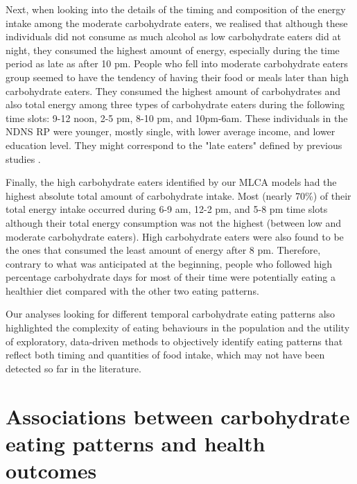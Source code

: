 Next, when looking into the details of the timing and composition of the energy intake among the moderate carbohydrate eaters, we realised that although these individuals did not consume as much alcohol as low carbohydrate eaters did at night, they consumed the highest amount of energy, especially during the time period as late as after 10 pm. People who fell into moderate carbohydrate eaters group seemed to have the tendency of having their food or meals later than high carbohydrate eaters. They consumed the highest amount of carbohydrates and also total energy among three types of carbohydrate eaters during the following time slots: 9-12 noon, 2-5 pm, 8-10 pm, and 10pm-6am. These individuals in the NDNS RP were younger, mostly single, with lower average income, and lower education level. They might correspond to the "late eaters" defined by previous studies \parencite{leech2017temporal, mansukhani2018investigating}. 

Finally, the high carbohydrate eaters identified by our MLCA models had the highest absolute total amount of carbohydrate intake. Most (nearly 70\%) of their total energy intake occurred during 6-9 am, 12-2 pm, and 5-8 pm time slots although their total energy consumption was not the highest (between low and moderate carbohydrate eaters). High carbohydrate eaters were also found to be the ones that consumed the least amount of energy after 8 pm. Therefore, contrary to what was anticipated at the beginning, people who followed high percentage carbohydrate days for most of their time were potentially eating a healthier diet compared with the other two eating patterns. 

Our analyses looking for different temporal carbohydrate eating patterns also highlighted the complexity of eating behaviours in the population and the utility of exploratory, data-driven methods to objectively identify eating patterns that reflect both timing and quantities of food intake, which may not have been detected so far in the literature.


\section{Associations between carbohydrate eating patterns and health outcomes}

